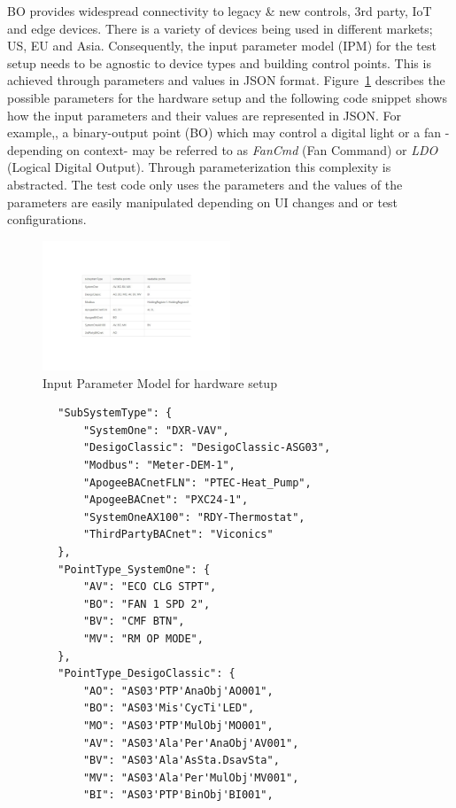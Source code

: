 \documentclass[conference]{IEEEtran}
\begin{document}
	BO provides widespread connectivity to legacy \& new controls, 3rd party, IoT and edge devices. There is a variety of devices being used in different markets; US, EU and Asia. 
	Consequently, the input parameter model (IPM) for the test setup needs to be agnostic to device types and building control points.
	This is achieved through parameters and values in JSON format.
	Figure~\ref{fig:commandingIPM} describes the possible parameters for the hardware setup and the following code snippet shows how the input parameters and their values are represented in JSON. 
	For example,, a binary-output point (BO) which may control a digital light or a fan -depending on context- may be referred to as \textit{FanCmd} (Fan Command) or \textit{LDO} (Logical Digital Output).
  Through parameterization this complexity is abstracted. The test code only uses the parameters and the values of the parameters are easily manipulated depending on UI changes and or test configurations.
	
	\begin{figure}[!t]
		\includegraphics[width=0.50\textwidth,]{commandingIPM.pdf}
		\caption{Input Parameter Model for hardware setup}
		\label{fig:commandingIPM}
	\end{figure}

	
	\begin{lstlisting}
		"SubSystemType": {
			"SystemOne": "DXR-VAV",
			"DesigoClassic": "DesigoClassic-ASG03",
			"Modbus": "Meter-DEM-1",
			"ApogeeBACnetFLN": "PTEC-Heat_Pump",
			"ApogeeBACnet": "PXC24-1",
			"SystemOneAX100": "RDY-Thermostat",
			"ThirdPartyBACnet": "Viconics"
		},
		"PointType_SystemOne": {
			"AV": "ECO CLG STPT",
			"BO": "FAN 1 SPD 2",
			"BV": "CMF BTN",
			"MV": "RM OP MODE",
		},
		"PointType_DesigoClassic": {
			"AO": "AS03'PTP'AnaObj'AO001",
			"BO": "AS03'Mis'CycTi'LED",
			"MO": "AS03'PTP'MulObj'MO001",
			"AV": "AS03'Ala'Per'AnaObj'AV001",
			"BV": "AS03'Ala'AsSta.DsavSta",
			"MV": "AS03'Ala'Per'MulObj'MV001",
			"BI": "AS03'PTP'BinObj'BI001",	
	\end{lstlisting}
\end{document}
